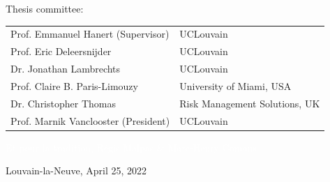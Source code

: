 \vspace*{0.5cm}
\begin{minipage}{\textwidth}
\begin{center}

\large Thesis committee:\\

\vspace*{0.5cm}
\footnotesize{
\hspace{-1cm}
\begin{tabular}{ll}
Prof. Emmanuel Hanert (Supervisor)   & UCLouvain \\
Prof. Eric Deleersnijder             & UCLouvain\\
Dr. Jonathan Lambrechts              & UCLouvain \\
Prof. Claire B. Paris-Limouzy        & University of Miami, USA \\
Dr. Christopher Thomas               & Risk Management Solutions, UK \\
Prof. Marnik Vanclooster (President) & UCLouvain
\end{tabular}
}
\newline
\vspace*{4em}
\newline
\textcolor{white}{Et pour la tradition, Régis Malpas \& Marc-Henry Comans}

\end{center}
\end{minipage}

\vspace*{.5cm}
\begin{minipage}{\textwidth}
\centering
\large Louvain-la-Neuve, April 25, 2022
\end{minipage}
